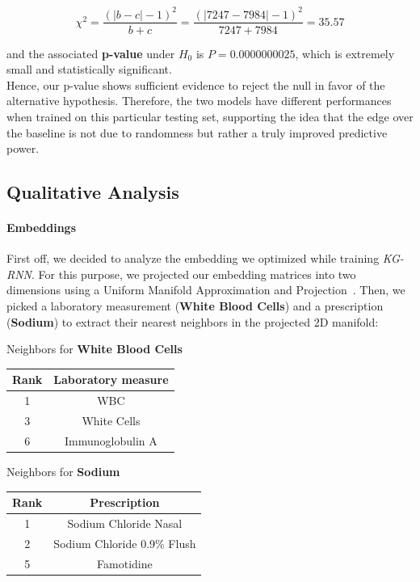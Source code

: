 \begin{equation}
\chi^2 = \frac{(|b-c|-1)^2}{b+c} = \frac{(|7247-7984|-1)^2}{7247+7984} = 35.57
\end{equation}

and the associated \textbf{p-value} under $H_0$ is $P=0.0000000025$, which is extremely small and statistically significant. \\

Hence, our p-value shows sufficient evidence to reject the null in favor of the alternative hypothesis. Therefore, the two models have different performances when trained on this particular testing set, supporting the idea that the edge over the baseline is not due to randomness but rather a truly improved predictive power.

\newpage
\subsection{Qualitative Analysis}
\label{subsec:Qualitative analysis}
\paragraph{Embeddings} First off, we decided to analyze the embedding we optimized while training \emph{KG-RNN}. For this purpose, we projected our embedding matrices into two dimensions using a Uniform Manifold Approximation and Projection~\cite{2018arXivUMAP}. Then, we picked a laboratory measurement (\textbf{White Blood Cells}) and a prescription (\textbf{Sodium}) to extract their nearest neighbors in the projected 2D manifold:
\begin{multicols}{2}
 \centering
 Neighbors for \textbf{White Blood Cells}
 \begin{center}
  \begin{tabular}{| c | c |}
   \hline
   \textbf{Rank} & \textbf{Laboratory measure} \\ \hline
   1 & WBC \\ \hline
   3 & White Cells \\ \hline
   6 & Immunoglobulin A \\
   \hline
  \end{tabular}
 \end{center}\columnbreak
 \vfill
 Neighbors for \textbf{Sodium}
 \begin{center}
  \begin{tabular}{| c | c |}
   \hline
   \textbf{Rank} & \textbf{Prescription} \\ \hline
   1 & Sodium Chloride Nasal \\ \hline
   2 & Sodium Chloride 0.9\%  Flush \\ \hline
   5 & Famotidine \\
   \hline
  \end{tabular}
 \end{center}
\end{multicols}

